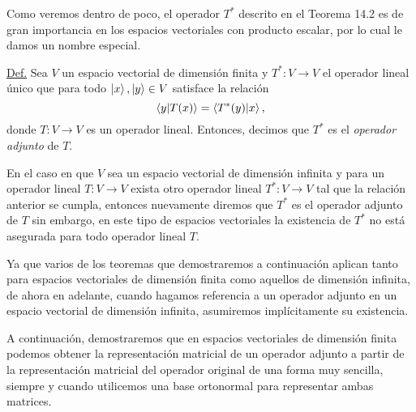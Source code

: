 \documentclass[12pt,dvipsnames]{article}
\begin{document}
Como veremos dentro de poco, el operador $T^*$ descrito en el Teorema 14.2 es de gran importancia en los espacios vectoriales con producto escalar, por lo cual le damos un nombre especial.

\hspace{0.5mm}
\begin{tcolorbox} \label{Def:Operador_adjunto}
\underline{Def.} Sea $V$ un espacio vectorial de dimensión finita y $T^*:V\to V$ el operador lineal único que para todo $\ket{x},\ket{y}\in V$ satisface la relación $$\braket{y|T(x)}=\braket{T^*(y)|x},$$ donde $T:V\to V$ es un operador lineal. Entonces, decimos que $T^*$ es el \emph{operador adjunto} de $T$.

\vspace{5mm}
\hspace{3mm} En el caso en que $V$ sea un espacio vectorial de dimensión infinita y para un operador lineal $T:V\to V$ exista otro operador lineal $T^*:V\to V$ tal que la relación anterior se cumpla, entonces nuevamente diremos que $T^*$ es el operador adjunto de $T$ \textemdash sin embargo, en este tipo de espacios vectoriales la existencia de $T^*$ no está asegurada para todo operador lineal $T$.
\end{tcolorbox}
\vspace{5mm}

Ya que varios de los teoremas que demostraremos a continuación aplican tanto para espacios vectoriales de dimensión finita como aquellos de dimensión infinita, de ahora en adelante, cuando hagamos referencia a un operador adjunto en un espacio vectorial de dimensión infinita, asumiremos implícitamente su existencia.

A continuación, demostraremos que en espacios vectoriales de dimensión finita podemos obtener la representación matricial de un operador adjunto a partir de la representación matricial del operador original de una forma muy sencilla, siempre y cuando utilicemos una base ortonormal para representar ambas matrices.

\end{document}

